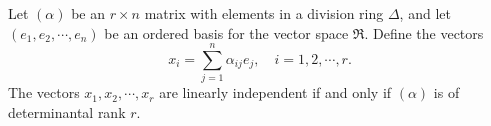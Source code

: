 Let $(\alpha)$ be an $r \times n$ matrix with elements in a division ring $\Delta$, and let $(e_1, e_2, \cdots, e_n)$ be an ordered basis for the vector space $\Re$. Define the vectors
$$
x_i = \sum_{j=1}^{n} \alpha_{ij} e_j, \quad i = 1, 2, \cdots, r.
$$
The vectors $x_1, x_2, \cdots, x_r$ are linearly independent if and only if $(\alpha)$ is of determinantal rank $r$.
